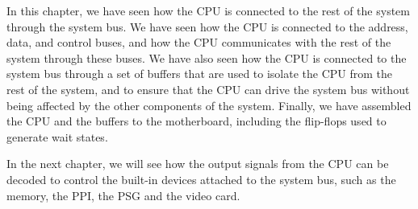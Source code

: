 In this chapter, we have seen how the CPU is connected to the rest of the system through the system
bus. We have seen how the CPU is connected to the address, data, and control buses, and how the CPU
communicates with the rest of the system through these buses. We have also seen how the CPU is
connected to the system bus through a set of buffers that are used to isolate the CPU from the rest
of the system, and to ensure that the CPU can drive the system bus without being affected by the
other components of the system. Finally, we have assembled the CPU and the buffers to the
motherboard, including the flip-flops used to generate wait states.

In the next chapter, we will see how the output signals from the CPU can be decoded to control the
built-in devices attached to the system bus, such as the memory, the PPI, the PSG and the video
card.